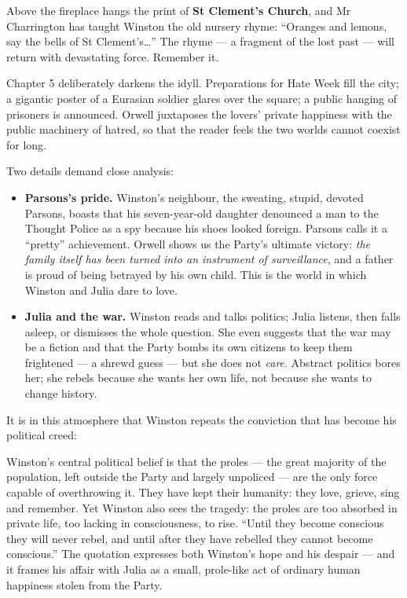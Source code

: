 \documentclass[11pt]{article}
\newcommand{\cle}[1]{{\popxbold\color{popdark}#1}}
\newcounter{popsec}
\newcounter{popsub}
\newcommand{\courssub}[1]{%
  \stepcounter{popsub}%
  \par\vspace{9pt}\noindent{\popxbold\fontsize{11.5}{13}\selectfont\color{popink}{\color{poporange}\thepopsec.\thepopsub}\hspace{6pt}#1}\par\nopagebreak\vspace{4pt}
}
\begin{document}
Above the fireplace hangs the print of \textbf{St Clement's Church}, and Mr Charrington has taught Winston the old nursery rhyme: ``Oranges and lemons, say the bells of St Clement's\ldots'' The rhyme --- a fragment of the lost past --- will return with devastating force. Remember it.

\courssub{Chapter 5: Hatred at Home, Hope in the Proles}

Chapter 5 deliberately darkens the idyll. Preparations for \cle{Hate Week} fill the city; a gigantic poster of a Eurasian soldier glares over the square; a public hanging of prisoners is announced. Orwell juxtaposes the lovers' private happiness with the public machinery of hatred, so that the reader feels the two worlds cannot coexist for long.

Two details demand close analysis:

\begin{itemize}
\item \textbf{Parsons's pride.} Winston's neighbour, the sweating, stupid, devoted Parsons, boasts that his seven-year-old daughter denounced a man to the Thought Police as a spy because his shoes looked foreign. Parsons calls it a ``pretty'' achievement. Orwell shows us the Party's ultimate victory: \emph{the family itself has been turned into an instrument of surveillance}, and a father is proud of being betrayed by his own child. This is the world in which Winston and Julia dare to love.
\item \textbf{Julia and the war.} Winston reads and talks politics; Julia listens, then falls asleep, or dismisses the whole question. She even suggests that the war may be a fiction and that the Party bombs its own citizens to keep them frightened --- a shrewd guess --- but she does not \emph{care}. Abstract politics bores her; she rebels because she wants her own life, not because she wants to change history.
\end{itemize}

It is in this atmosphere that Winston repeats the conviction that has become his political creed:

\begin{aretenir}
Winston's central political belief is that the \cle{proles} --- the great majority of the population, left outside the Party and largely unpoliced --- are the only force capable of overthrowing it. They have kept their humanity: they love, grieve, sing and remember. Yet Winston also sees the tragedy: the proles are too absorbed in private life, too lacking in consciousness, to rise. ``Until they become conscious they will never rebel, and until after they have rebelled they cannot become conscious.'' The quotation expresses both Winston's hope and his despair --- and it frames his affair with Julia as a small, prole-like act of ordinary human happiness stolen from the Party.
\end{aretenir}
\end{document}
